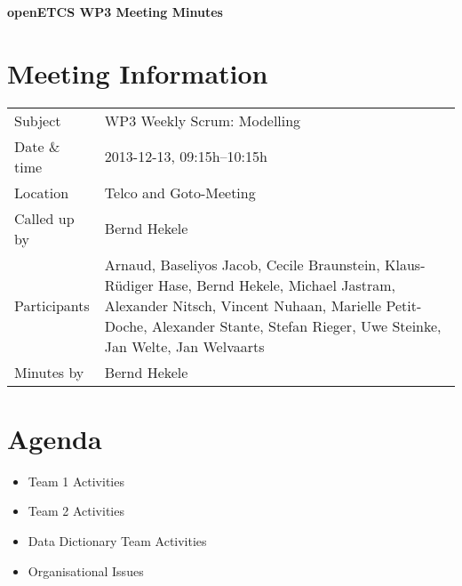 \documentclass[a4paper, 11pt]{article}
\begin{document}
{\begin{center}\huge\bf openETCS WP3 Meeting Minutes\end{center}}
\section{Meeting Information}

\renewcommand{\arraystretch}{1.5}
\begin{supertabular}{m{.2\textwidth}m{.8\textwidth}}
Subject & WP3 Weekly Scrum: Modelling\\
Date \& time & 2013-12-13, 09:15h--10:15h\\
Location & Telco and Goto-Meeting\\
Called up by & Bernd Hekele\\
Participants &
Arnaud,
Baseliyos Jacob,
Cecile Braunstein,
Klaus-R\"udiger Hase,
Bernd Hekele,
Michael Jastram,
Alexander Nitsch,
Vincent Nuhaan,
Marielle Petit-Doche,
Alexander Stante,
Stefan Rieger,
Uwe Steinke,
Jan Welte,
Jan Welvaarts
\\

Minutes by & Bernd Hekele\\
\end{supertabular}
\renewcommand{\arraystretch}{1.0}


\section{{Agenda}}
\begin{itemize}
\item Team 1 Activities
\item Team 2 Activities
\item Data Dictionary Team Activities
\item Organisational Issues 
\end{itemize}
\end{document}
